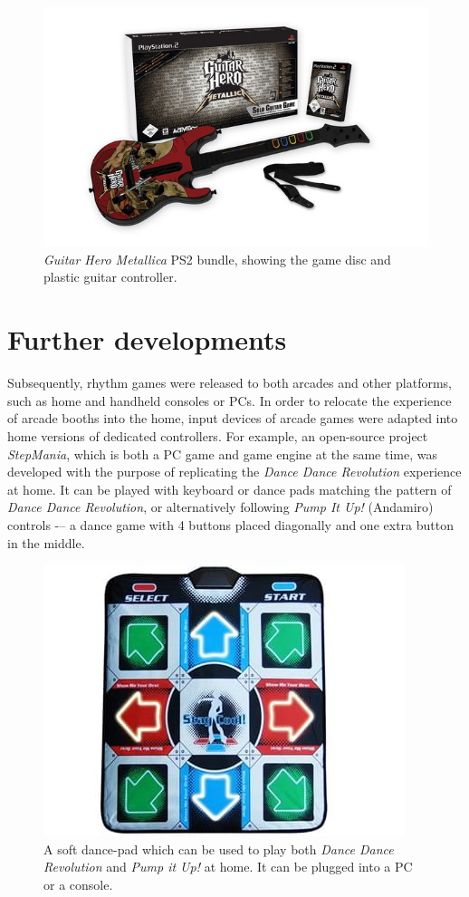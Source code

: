 \begin{figure}[h]
    \centering\includegraphics[scale=0.6]{obrazki/gh2bundle.jpg}
    \caption{\textit{Guitar Hero Metallica} PS2 bundle, showing the game disc and plastic guitar controller. \cite{gh2bundle}}
    \label{fig:gh2_bundle}
\end{figure}

\section{Further developments}
Subsequently, rhythm games were released to both arcades and other platforms, such as home and handheld consoles or PCs. In order to relocate the experience of arcade booths into the home, input devices of arcade games were adapted into home versions of dedicated controllers. For example, an open-source project \textit{StepMania}, which is both a PC game and game engine at the same time, was developed with the purpose of replicating the \textit{Dance Dance Revolution} experience at home. It can be played with keyboard or dance pads matching the pattern of \textit{Dance Dance Revolution}, or alternatively following \textit{Pump It Up!} (Andamiro) controls -– a dance game with 4 buttons placed diagonally and one extra button in the middle.

\begin{figure}[h]
    \centering\includegraphics[scale=0.7]{obrazki/ddrsoftpad.jpg}
    \caption{A soft dance-pad which can be used to play both \textit{Dance Dance Revolution} and \textit{Pump it Up!} at home. It can be plugged into a PC or a console. \cite{ddrsoftpad}}
    \label{fig:ddr_softpad}
\end{figure}

